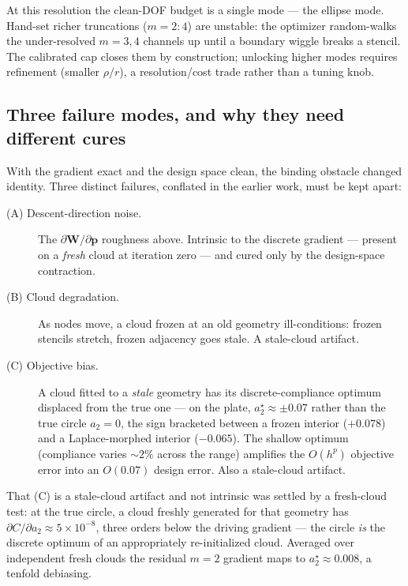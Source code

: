 \documentclass[11pt,a4paper]{article}
\newcommand{\mat}[1]{\mathbf{#1}}
\newcommand{\vect}[1]{\boldsymbol{#1}}
\newcommand{\pts}{\vect{p}}
\begin{document}
At this resolution the clean-DOF budget is a single mode --- the ellipse mode.
Hand-set richer truncations ($m{=}2{:}4$) are unstable: the optimizer random-walks
the under-resolved $m{=}3,4$ channels up until a boundary wiggle breaks a stencil.
The calibrated cap closes them by construction; unlocking higher modes requires
refinement (smaller $\rho/r$), a resolution/cost trade rather than a tuning knob.

\subsection{Three failure modes, and why they need different cures}
\label{sec:plate-three}

With the gradient exact and the design space clean, the binding obstacle changed
identity. Three distinct failures, conflated in the earlier work, must be kept
apart:

\begin{description}
\item[(A) Descent-direction noise.] The $\partial\mat W/\partial\pts$ roughness
  above. Intrinsic to the discrete gradient --- present on a \emph{fresh} cloud at
  iteration zero --- and cured only by the design-space contraction.
\item[(B) Cloud degradation.] As nodes move, a cloud frozen at an old geometry
  ill-conditions: frozen stencils stretch, frozen adjacency goes stale. A
  stale-cloud artifact.
\item[(C) Objective bias.] A cloud fitted to a \emph{stale} geometry has its
  discrete-compliance optimum displaced from the true one --- on the plate,
  $a_2^\star\approx\pm0.07$ rather than the true circle $a_2=0$, the sign
  bracketed between a frozen interior ($+0.078$) and a Laplace-morphed interior
  ($-0.065$). The shallow optimum (compliance varies $\sim\!2\%$ across the range)
  amplifies the $O(h^p)$ objective error into an $O(0.07)$ design error. Also a
  stale-cloud artifact.
\end{description}

That (C) is a stale-cloud artifact and not intrinsic was settled by a fresh-cloud
test: at the true circle, a cloud freshly generated for that geometry has
$\partial C/\partial a_2 \approx 5\times10^{-8}$, three orders below the driving
gradient --- the circle \emph{is} the discrete optimum of an appropriately
re-initialized cloud. Averaged over independent fresh clouds the residual $m{=}2$
gradient maps to $a_2^\star\approx0.008$, a tenfold debiasing.
\end{document}
